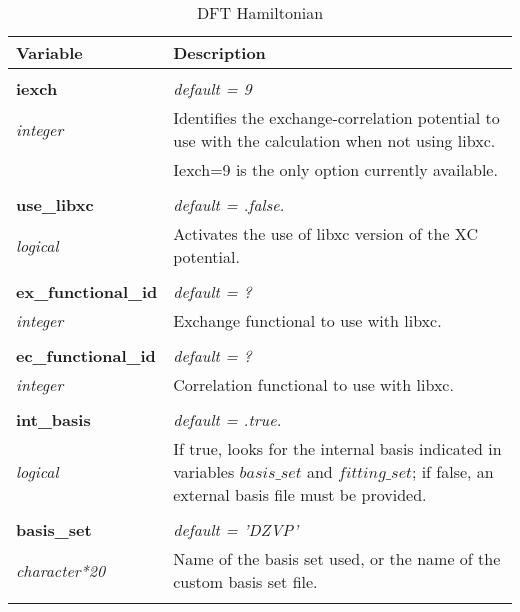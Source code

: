 \begin{Spacing}{1.0}
\begin{longtable}{ p{} p{} }

   \toprule
   \textbf{Variable} & Description \\*
   \midrule \\*
   \endhead

   \bottomrule
   \caption{DFT Hamiltonian}
   \endfoot

   \textbf{iexch}
   &  \textit{default = 9}
   \\*\textit{integer}
   & Identifies the exchange-correlation potential to use
   with the calculation when not using libxc.\\*
   & Iexch=9 is the only option currently available.\\* \\

   \textbf{use\_libxc}
   &  \textit{default = .false. }
   \\*\textit{logical}
   & Activates the use of libxc version of the XC
   potential.\\* \\

   \textbf{ex\_functional\_id}
   &  \textit{default = ?}
   \\*\textit{integer}
   & Exchange functional to use with libxc.\\* \\

   \textbf{ec\_functional\_id}
   &  \textit{default = ?}
   \\*\textit{integer}
   & Correlation functional to use with libxc.\\* \\

   \textbf{int\_basis}
   &  \textit{default = .true. }
   \\*\textit{logical}
   & If true, looks for the internal basis indicated in
   variables $basis\_set$ and $fitting\_set$; if false, 
   an external basis file must be provided. \\* \\

   \textbf{basis\_set}
   &  \textit{default = 'DZVP'}
   \\*\textit{character*20}
   & Name of the basis set used, or the name of the
   custom basis set file.\\* \\


\end{longtable}
\end{Spacing}
